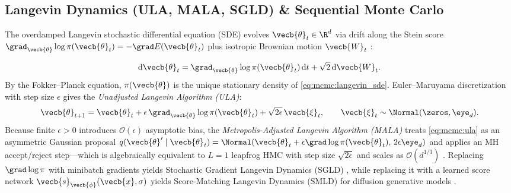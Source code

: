 \documentclass[../../../../master.tex]{subfiles}
\begin{document}
\subsection{Langevin Dynamics (ULA, MALA, SGLD) \& Sequential Monte Carlo}
\label{subsec:mcmc:langevin_smc}

{\sloppy The overdamped Langevin stochastic differential equation (SDE) evolves $\vecb{\theta}_t \in \R^d$ via drift along the Stein score $\grad_{\vecb{\theta}}\log\pi(\vecb{\theta}_t) = -\grad E(\vecb{\theta}_t)$ plus isotropic Brownian motion $\vecb{W}_t$   :\par}
\begin{equation}
  \label{eq:mcmc:langevin_sde}
  \mathrm{d}\vecb{\theta}_t = \grad_{\vecb{\theta}}\log\pi(\vecb{\theta}_t)\,\mathrm{d}t + \sqrt{2}\,\mathrm{d}\vecb{W}_t.
\end{equation}
By the Fokker--Planck equation, $\pi(\vecb{\theta})$ is the unique stationary density of \eqref{eq:mcmc:langevin_sde}. Euler--Maruyama discretization with step size $\epsilon$ gives the \emph{Unadjusted Langevin Algorithm (ULA)}:
\begin{equation}
  \label{eq:mcmc:ula}
  \vecb{\theta}_{t+1} = \vecb{\theta}_t + \epsilon\,\grad_{\vecb{\theta}}\log\pi(\vecb{\theta}_t) + \sqrt{2\epsilon}\,\vecb{\xi}_t, \qquad \vecb{\xi}_t \sim \Normal(\zeros, \eye_d).
\end{equation}
Because finite $\epsilon > 0$ introduces $\mathcal{O}(\epsilon)$ asymptotic bias, the \emph{Metropolis-Adjusted Langevin Algorithm (MALA)} treats \eqref{eq:mcmc:ula} as an asymmetric Gaussian proposal $q(\vecb{\theta}' \mid \vecb{\theta}_t) = \Normal(\vecb{\theta}_t + \epsilon\grad\log\pi(\vecb{\theta}_t),\, 2\epsilon\eye_d)$ and applies an MH accept/reject step---which is algebraically equivalent to $L=1$ leapfrog HMC with step size $\sqrt{2\epsilon}$ and scales as $\mathcal{O}(d^{1/3})$ . Replacing $\grad\log\pi$ with minibatch gradients yields Stochastic Gradient Langevin Dynamics (SGLD) , while replacing it with a learned score network $\vecb{s}_{\vecb{\phi}}(\vecb{x}, \sigma)$ yields Score-Matching Langevin Dynamics (SMLD) for diffusion generative models .
\end{document}
